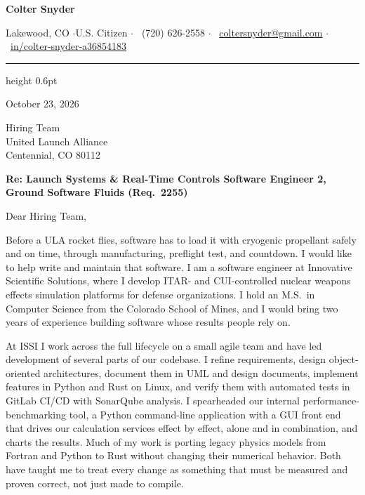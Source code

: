 \documentclass[letterpaper,11pt]{article}
\begin{document}
\begin{center}
  {\Huge\bfseries Colter Snyder}\par\vspace{4pt}
  \footnotesize
  Lakewood, CO \enspace$\cdot$\enspace U.S. Citizen \enspace$\cdot$\enspace
  \faPhone*\ (720) 626-2558 \enspace$\cdot$\enspace
  \faEnvelope\ \href{mailto:coltersnyder@gmail.com}{coltersnyder@gmail.com} \enspace$\cdot$\enspace
  \mbox{\faLinkedin\ \href{https://www.linkedin.com/in/colter-snyder-a36854183/}{in/colter-snyder-a36854183}}
\end{center}
{\color{accent}\hrule height 0.6pt}
\vspace{6pt}

October 23, 2026

Hiring Team\\
United Launch Alliance\\
Centennial, CO 80112

\textbf{Re: Launch Systems \& Real-Time Controls Software Engineer 2, Ground Software Fluids (Req.\ 2255)}

Dear Hiring Team,

Before a ULA rocket flies, software has to load it with cryogenic propellant safely and on time,
through manufacturing, preflight test, and countdown. I would like to help write and maintain that
software. I am a software engineer at Innovative Scientific Solutions, where I develop ITAR- and
CUI-controlled nuclear weapons effects simulation platforms for defense organizations. I hold an
M.S.\ in Computer Science from the Colorado School of Mines, and I would bring two years of
experience building software whose results people rely on.

At ISSI I work across the full lifecycle on a small agile team and have led development of several
parts of our codebase. I refine requirements, design object-oriented architectures, document them in
UML and design documents, implement features in Python and Rust on Linux, and verify them with
automated tests in GitLab CI/CD with SonarQube analysis. I spearheaded our internal
performance-benchmarking tool, a Python command-line application with a GUI front end that drives our
calculation services effect by effect, alone and in combination, and charts the results. Much of my work is porting legacy physics
models from Fortran and Python to Rust without changing their numerical behavior. Both have taught
me to treat every change as something that must be measured and proven correct, not just made to
compile.
\end{document}
